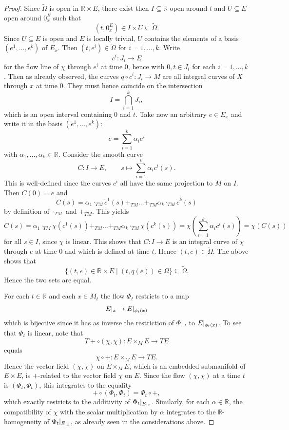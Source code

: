 \documentclass{amsart}
\theoremstyle{plain}
\newcommand{\R}{\mathbb{R}}
\newcommand{\an}[1]{\arrowvert_{#1}}
\begin{document}
\begin{proof}
Since $\widetilde \Omega$ is open in $\mathbb R\times E$, there exist then $I\subseteq \mathbb R$ open around $t$ and $U\subseteq E$ open around $0^E_x$ such that 
\[ (t, 0^E_x)\in I\times U\subseteq \widetilde \Omega.
\]
Since $U\subseteq E$ is open and $E$ is locally trivial, $U$ contains the elements of a basis $(e^1, \ldots, e^k)$ of $E_x$.
Then $(t,e^i)\in \widetilde \Omega$ for $i=1,\ldots, k$. Write 
\[ c^i\colon J_i\to E
\]
for the flow line of $\chi$ through $e^i$ at time $0$, hence with $0, t\in J_i$ for each $i=1,\ldots, k$. Then as already observed, the curves $q\circ c^i\colon J_i\to M$ are all integral curves of $X$ through $x$ at time $0$. They must hence coincide on the intersection
\[ I=\bigcap_{i=1}^k J_i,
\]
which is an open interval containing $0$ and $t$.
Take now an arbitrary $e\in E_x$ and write it in the basis $(e^1, \ldots, e^k)$:
\[ e=\sum_{i=1}^k \alpha_ie^i
\]
with $\alpha_1,\ldots, \alpha_k\in\mathbb R$.  
Consider the smooth curve 
\[ C\colon I\to E, \qquad s\mapsto \sum_{i=1}^k\alpha_i c^i(s).
\]
This is well-defined since the curves $c^i$ all have the same projection to $M$ on $I$.
Then $C(0)=e$ and 
\[ \dot C(s)=\alpha_1\cdot_{TM}\dot c^1(s)+_{TM}\ldots+_{TM}\alpha_k\cdot_{TM} \dot c^k(s)
\]
by definition of $\cdot_{TM}$ and $+_{TM}$.
This yields 
\[ \dot C(s)=\alpha_1\cdot_{TM}\chi(c^1(s))+_{TM}\ldots+_{TM}\alpha_k\cdot_{TM} \chi(c^k(s))=\chi\left( \sum_{i=1}^k\alpha_i c^i(s)
\right)=\chi(C(s))
\]
for all $s\in I$,
since $\chi$ is linear. This shows that $C\colon I\to E$ is an integral curve of $\chi$ through $e$ at time $0$ and which is defined at time $t$. 
Hence $(t,e)\in \widetilde \Omega$. The above shows that 
\[ \{(t, e)\in \mathbb R\times E\mid (t, q(e))\in \Omega\}\subseteq \widetilde \Omega.
\]
Hence the two sets are equal.


\medskip
For each $t\in \R$ and each $x\in M_t$ the flow $\Phi_t$ restricts to a map
\[ E\an{x}\to E\an{\phi_t(x)}
\]
which is bijective since it has as inverse the restriction of $\Phi_{-t}$ to $E\an{\phi_t(x)}$.
To see that $\Phi_t$ is linear, note that 
\[ T\!\!+\circ(\chi,\chi)\colon E\times_ME\to TE
\]
equals 
\[ \chi\circ +\colon E\times_ME\to TE.
\]
Hence the vector field $(\chi, \chi)$ on $E\times_M E$, which is an embedded submanifold of $E\times E$, is $+$-related to the vector field $\chi$ on $E$. Since the flow $(\chi, \chi)$ at a time $t$ is $(\Phi_t,\Phi_t)$, this integrates to the equality
\[ +\circ (\Phi_t,\Phi_t)=\Phi_t\circ +,
\]
which exactly restricts to the additivity of $\Phi_t\an{E\an x}$. Similarly, for each $\alpha\in \R$, the compatibility of $\chi$ with the scalar multiplication by $\alpha$ integrates to the $\mathbb R$-homogeneity of $\Phi_t\an{E\an x}$, as already seen in the considerations above.
\end{proof}
\end{document}

